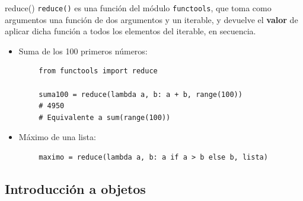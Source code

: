 \documentclass[10pt]{beamer} %
\begin{document}
\begin{frame}[fragile]{reduce()}
    \texttt{reduce()} es una función del módulo \texttt{functools}, que toma como argumentos una función de dos argumentos y un iterable, y devuelve el \textbf{valor} de aplicar dicha función a todos los elementos del iterable, en secuencia.
    \begin{itemize}
        \item Suma de los 100 primeros números:
    \end{itemize}
    \begin{verbatim}
        from functools import reduce
        
        suma100 = reduce(lambda a, b: a + b, range(100))
        # 4950
        # Equivalente a sum(range(100))
    \end{verbatim}
    \begin{itemize}
        \item Máximo de una lista:
    \end{itemize}
    \begin{verbatim}
        maximo = reduce(lambda a, b: a if a > b else b, lista)
    \end{verbatim}
\end{frame}

\subsection{Introducción a objetos}
\end{document}
